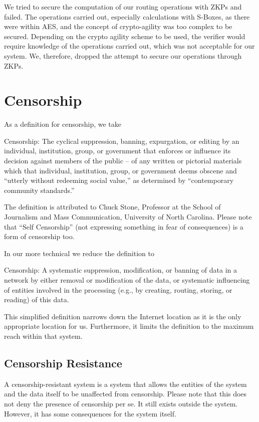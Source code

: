 We tried to secure the computation of our routing operations with ZKPs and failed. The operations carried out, especially calculations with S-Boxes, as there were within AES, and the concept of crypto-agility was too complex to be secured. Depending on the crypto agility scheme to be used, the verifier would require knowledge of the operations carried out, which was not acceptable for our system. We, therefore, dropped the attempt to secure our operations through ZKPs.

\section{Censorship}
As a definition for censorship, we take
\begin{shadequote}{}
	Censorship: The cyclical suppression, banning, expurgation, or editing by an individual, institution, group, or government that enforces or influence its decision against members of the public -- of any written or pictorial materials which that individual, institution, group, or government deems obscene and ``utterly without redeeming social value,'' as determined by ``contemporary community standards.''
\end{shadequote}

The definition is attributed to Chuck Stone, Professor at the School of Journalism and Mass Communication, University of North Carolina. Please note that ``Self Censorship'' (not expressing something in fear of consequences) is a form of censorship too.

In our more technical we reduce the definition to
\begin{shadequote}{}
	Censorship: A systematic suppression, modification, or banning of data in a network by either removal or modification of the data, or systematic influencing of entities involved in the processing (e.g., by creating, routing, storing, or reading) of this data.
\end{shadequote}
This simplified definition narrows down the Internet location as it is the only appropriate location for us.  Furthermore, it limits the definition to the maximum reach within that system.

\subsection{Censorship Resistance}
A censorship-resistant system is a system that allows the entities of the system and the data itself to be unaffected from censorship. Please note that this does not deny the presence of censorship per se. It still exists outside the system. However, it has some consequences for the system itself.

